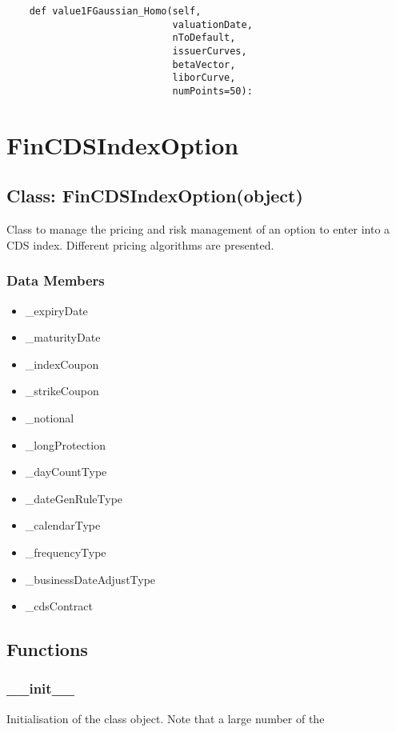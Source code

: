 \documentclass[twoside,11pt]{book}
\begin{document}
\begin{lstlisting}
    def value1FGaussian_Homo(self,
                             valuationDate,
                             nToDefault,
                             issuerCurves,
                             betaVector,
                             liborCurve,
                             numPoints=50):
\end{lstlisting}

\newpage
\section{FinCDSIndexOption}

\subsection*{Class: FinCDSIndexOption(object)}
Class to manage the pricing and risk management of an option to enter into a CDS index. Different pricing algorithms are presented. 

\subsubsection*{Data Members}
\begin{itemize}
\item{\_expiryDate}
\item{\_maturityDate}
\item{\_indexCoupon}
\item{\_strikeCoupon}
\item{\_notional}
\item{\_longProtection}
\item{\_dayCountType}
\item{\_dateGenRuleType}
\item{\_calendarType}
\item{\_frequencyType}
\item{\_businessDateAdjustType}
\item{\_cdsContract}
\end{itemize}

\subsection*{Functions}

\subsubsection*{{\bf \_\_init\_\_}}
Initialisation of the class object. Note that a large number of the 
\end{document}
